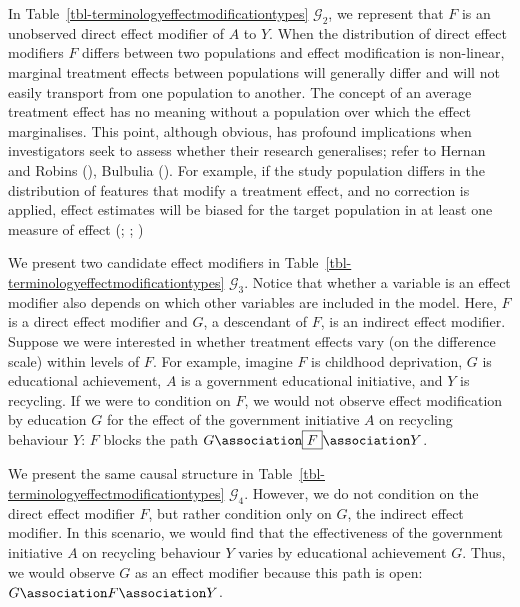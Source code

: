 \documentclass[
  single column]{article}
\begin{document}
In Table~\ref{tbl-terminologyeffectmodificationtypes} \(\mathcal{G}_2\),
we represent that \(F\) is an unobserved direct effect modifier of \(A\)
to \(Y\). When the distribution of direct effect modifiers \(F\) differs
between two populations and effect modification is non-linear, marginal
treatment effects between populations will generally differ and will not
easily transport from one population to another. The concept of an
average treatment effect has no meaning without a population over which
the effect marginalises. This point, although obvious, has profound
implications when investigators seek to assess whether their research
generalises; refer to Hernan and Robins
(), Bulbulia
(). For example, if the study
population differs in the distribution of features that modify a
treatment effect, and no correction is applied, effect estimates will be
biased for the target population in at least one measure of effect
(;
;
)

We present two candidate effect modifiers in
Table~\ref{tbl-terminologyeffectmodificationtypes} \(\mathcal{G}_3\).
Notice that whether a variable is an effect modifier also depends on
which other variables are included in the model. Here, \(F\) is a direct
effect modifier and \(G\), a descendant of \(F\), is an indirect effect
modifier. Suppose we were interested in whether treatment effects vary
(on the difference scale) within levels of \(F\). For example, imagine
\(F\) is childhood deprivation, \(G\) is educational achievement, \(A\)
is a government educational initiative, and \(Y\) is recycling. If we
were to condition on \(F\), we would not observe effect modification by
education \(G\) for the effect of the government initiative \(A\) on
recycling behaviour \(Y\): \(\boxed{F}\) blocks the path
\(G \association \boxed{F} \association Y\).

We present the same causal structure in
Table~\ref{tbl-terminologyeffectmodificationtypes} \(\mathcal{G}_4\).
However, we do not condition on the direct effect modifier \(F\), but
rather condition only on \(G\), the indirect effect modifier. In this
scenario, we would find that the effectiveness of the government
initiative \(A\) on recycling behaviour \(Y\) varies by educational
achievement \(G\). Thus, we would observe \(G\) as an effect modifier
because this path is open: \(G \association F \association Y\).
\end{document}
